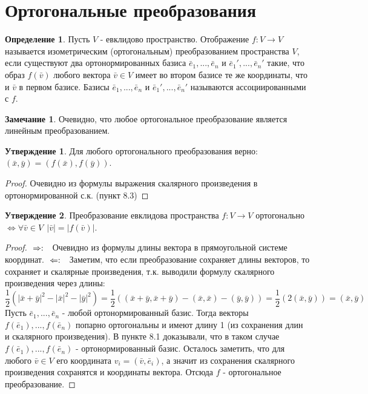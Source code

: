 \documentclass[a4paper, 12pt]{article}
\theoremstyle{definition}
\newtheorem*{definition}{Определение}
\newtheorem*{subtheorem}{Утверждение}
\newtheorem*{remark}{Замечание}
\begin{document}
\section{Ортогональные преобразования}
\begin{definition}
	Пусть $V$ - евклидово пространство. Отображение $f: V \rightarrow V$ называется изометрическим (ортогональным) преобразованием пространства $V$, если существуют два ортонормированных базиса $\bar{e}_{1},...,\bar{e}_{n}$ и $\bar{e}_{1}',...,\bar{e}_{n}'$ такие, что образ $f(\bar{v})$ любого вектора $\bar{v} \in V$ имеет во втором базисе те же координаты, что и $\bar{v}$ в первом базисе. Базисы $\bar{e}_{1},...,\bar{e}_{n}$ и $\bar{e}_{1}',...,\bar{e}_{n}'$ называются ассоциированными с $f$.
\end{definition}
\begin{remark}
	Очевидно, что любое ортогональное преобразование является линейным преобразованием.
\end{remark}
\begin{subtheorem}
	Для любого ортогонального преобразования верно: $(\bar{x}, \bar{y}) = (f(\bar{x}), f(\bar{y}))$.
\end{subtheorem}
\begin{proof}
	Очевидно из формулы выражения скалярного произведения в ортонормированной с.к. (пункт 8.3)
\end{proof}
\begin{subtheorem}
	Преобразование евклидова пространства $f: V\rightarrow V$ ортогонально $\Leftrightarrow \forall \bar{v} \in V \ \ |\bar{v}| = |f(\bar{v})|$.
\end{subtheorem}
\begin{proof}
	$\\\Rightarrow: \ \ $ Очевидно из формулы длины вектора в прямоугольной системе координат.
	$\\\Leftarrow: \ \ $ Заметим, что если преобразование сохраняет длины векторов, то сохраняет и скалярные произведения, т.к. выводили формулу скалярного произведения через длины: $$\frac{1}{2}(|\bar{x} + \bar{y}|^2 - |\bar{x}|^2 - |\bar{y}|^2) = \frac{1}{2}((\bar{x} + \bar{y}, \bar{x} + \bar{y}) - (\bar{x}, \bar{x}) - (\bar{y}, \bar{y})) = \frac{1}{2}(2(\bar{x}, \bar{y})) = (\bar{x}, \bar{y})$$
	Пусть $\bar{e}_{1},...,\bar{e}_{n}$ - любой ортонормированный базис. Тогда векторы $f(\bar{e}_{1}),...,f(\bar{e}_{n})$ попарно ортогональны и имеют длину 1 (из сохранения длин и скалярного произведения). В пункте 8.1 доказывали, что в таком случае $f(\bar{e}_{1}),...,f(\bar{e}_{n})$ - ортонормированный базис. Осталось заметить, что для любого $\bar{v} \in V$ его координата $v_i = (\bar{v}, \bar{e}_{i})$, а значит из сохранения скалярного произведения сохранятся и координаты вектора. Отсюда $f$ - ортогональное преобразование.
\end{proof}
\end{document}
